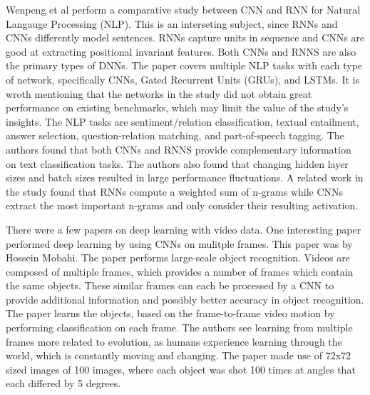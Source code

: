 Wenpeng et al perform a comparative study between CNN and RNN for Natural Langauge Processing (NLP).  This is an interseting subject, since RNNs and CNNs differently model sentences.  RNNs capture units in sequence and CNNs are good at extracting positional invariant features.  Both CNNs and RNNS are also the primary types of DNNs.  The paper covers multiple NLP tasks with each type of network, specifically CNNs, Gated Recurrent Units (GRUs), and LSTMs.  It is wroth mentioning that the networks in the study did not obtain great performance on existing benchmarks, which may limit the value of the study's insights.  The NLP tasks are sentiment/relation classification, textual entailment, answer selection, question-relation matching, and part-of-speech tagging.  The authors found that both CNNs and RNNS provide complementary information on text classification tasks.  The authors also found that changing hidden layer sizes and batch sizes resulted in large performance fluctuations.  A related work in the study found that RNNs compute a weighted sum of n-grams while CNNs extract the most important n-grams and only consider their resulting activation.

There were a few papers on deep learning with video data.  One interesting paper performed deep learning by using CNNs on mulitple frames.  This paper was by Hossein Mobahi.  The paper performs large-scale object recognition.  Videos are composed of multiple frames, which provides a number of frames which contain the same objects.  These similar frames can each be processed by a CNN to provide additional information and possibly better accuracy in object recognition.  The paper learns the objects, based on the frame-to-frame video motion by performing classification on each frame.  The authors see learning from multiple frames more related to evolution, as humans experience learning through the world, which is constantly moving and changing.  The paper made use of 72x72 sized images of 100 images, where each object was shot 100 times at angles that each differed by 5 degrees.


